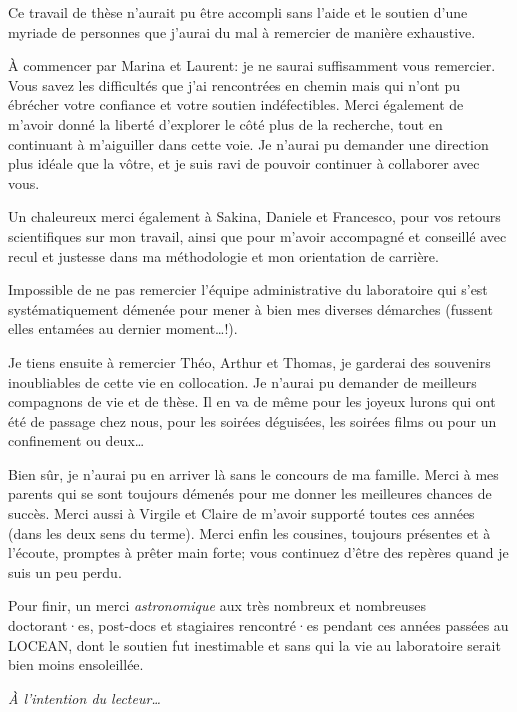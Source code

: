 Ce travail de thèse n'aurait pu être accompli sans l'aide et le soutien d'une myriade de personnes que j'aurai du mal à remercier de manière exhaustive.

À commencer par Marina et Laurent: je ne saurai suffisamment vous remercier.
Vous savez les difficultés que j'ai rencontrées en chemin mais qui n'ont pu ébrécher votre confiance et votre soutien indéfectibles.
Merci également de m'avoir donné la liberté d'explorer le côté plus  de la recherche, tout en continuant à m'aiguiller dans cette voie.
Je n'aurai pu demander une direction plus idéale que la vôtre, et je suis ravi de pouvoir continuer à collaborer avec vous.

Un chaleureux merci également à Sakina, Daniele et Francesco, pour vos retours scientifiques sur mon travail, ainsi que pour m'avoir accompagné et conseillé avec recul et justesse dans ma méthodologie et mon orientation de carrière.

Impossible de ne pas remercier l'équipe administrative du laboratoire qui  s'est systématiquement démenée pour mener à bien mes diverses démarches (fussent elles entamées au dernier moment\ldots{}!).

Je tiens ensuite à remercier Théo, Arthur et Thomas, je garderai des souvenirs inoubliables de cette vie en collocation. Je n'aurai pu demander de meilleurs compagnons de vie et de thèse.
Il en va de même pour les joyeux lurons qui ont été de passage chez nous, pour les soirées déguisées, les soirées films  ou pour un confinement ou deux\ldots

Bien sûr, je n'aurai pu en arriver là sans le concours de ma famille.
Merci à mes parents qui se sont toujours démenés pour me donner les meilleures chances de succès.
Merci aussi à Virgile et Claire de m'avoir supporté toutes ces années (dans les deux sens du terme).
Merci enfin les cousines, toujours présentes et à l'écoute, promptes à prêter main forte; vous continuez d'être des repères quand je suis un peu perdu.

Pour finir, un merci \emph{astronomique} aux très nombreux et nombreuses doctorant·es, post-docs et stagiaires rencontré·es pendant ces années passées au LOCEAN, dont le soutien fut inestimable et sans qui la vie au laboratoire serait bien moins ensoleillée.


\clearpage
\thispagestyle{thesis-empty}

\vspace*{5ex}
\par\addvspace{\beforesecskip}\addvspace{\baselineskip}
\par\noindent\textit{À l'intention du lecteur\dots}\par
\vspace{\aftersecskip}

